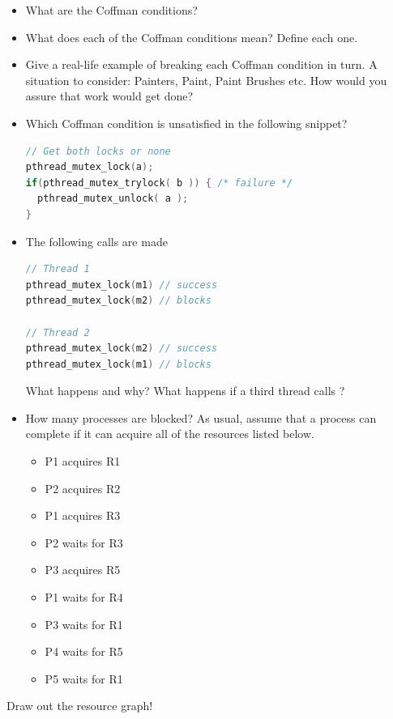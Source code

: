 \begin{itemize}
	\item
	      What are the Coffman conditions?
	\item
	      What does each of the Coffman conditions mean? Define each one.
	\item
	      Give a real-life example of breaking each Coffman condition in turn. A situation to consider: Painters, Paint, Paint Brushes etc. How would you assure that work would get done?
	\item
	      Which Coffman condition is unsatisfied in the following snippet?
	      
	      \begin{lstlisting}[language=C]
// Get both locks or none
pthread_mutex_lock(a);
if(pthread_mutex_trylock( b )) { /* failure */
  pthread_mutex_unlock( a );
}
	      \end{lstlisting}
	\item
	      The following calls are made
	      
	      \begin{lstlisting}[language=c]
// Thread 1
pthread_mutex_lock(m1) // success
pthread_mutex_lock(m2) // blocks

// Thread 2
pthread_mutex_lock(m2) // success
pthread_mutex_lock(m1) // blocks
	      \end{lstlisting}
	      
	      What happens and why? What happens if a third thread calls
	       ?
	\item
	      How many processes are blocked? As usual, assume that a process can complete if it can acquire all of the resources listed
	      below.
	      
	      \begin{itemize}
	      	\tightlist
	      	\item
	      	      P1 acquires R1
	      	\item
	      	      P2 acquires R2
	      	\item
	      	      P1 acquires R3
	      	\item
	      	      P2 waits for R3
	      	\item
	      	      P3 acquires R5
	      	\item
	      	      P1 waits for R4
	      	\item
	      	      P3 waits for R1
	      	\item
	      	      P4 waits for R5
	      	\item
	      	      P5 waits for R1
	      \end{itemize}
\end{itemize}

Draw out the resource graph!



